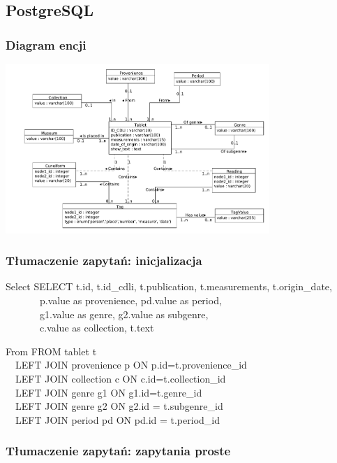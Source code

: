 \subsection{PostgreSQL}

\begin{frame}
 \frametitle{Diagram encji}
 \includegraphics[width=100mm]{../diagramy/diagram-encji-maly.pdf}
\end{frame}

\begin{frame}
 \frametitle{Tłumaczenie zapytań: inicjalizacja}
 \begin{block}{Select}
SELECT t.id, t.id\_cdli, t.publication, t.measurements, t.origin\_date, \\
~~~~~~~p.value as provenience, pd.value as period, \\
~~~~~~~g1.value as genre, g2.value as subgenre, \\
~~~~~~~c.value as collection, t.text 
 \end{block}
\begin{block}{From}
FROM tablet t \\
~~LEFT JOIN provenience p ON p.id=t.provenience\_id \\
~~LEFT JOIN collection c ON c.id=t.collection\_id \\
~~LEFT JOIN genre g1 ON g1.id=t.genre\_id \\
~~LEFT JOIN genre g2 ON g2.id = t.subgenre\_id \\
~~LEFT JOIN period pd ON pd.id = t.period\_id \\
\end{block}

\end{frame}

\begin{frame}
 \frametitle{Tłumaczenie zapytań: zapytania proste}

\end{frame}

